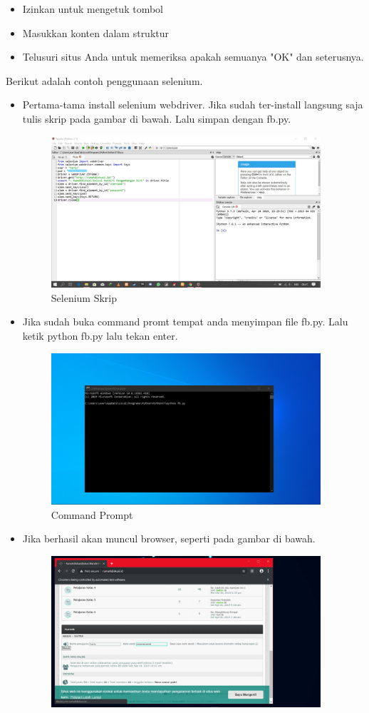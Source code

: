 \documentclass{article}
\begin{document}
\begin{itemize}
\item Izinkan untuk mengetuk tombol
\item Masukkan konten dalam struktur
\item Telusuri situs Anda untuk memeriksa apakah semuanya "OK" dan seterusnya.
\end{itemize}
Berikut adalah contoh penggunaan selenium.
\begin{itemize}
\item Pertama-tama install selenium webdriver. Jika sudah ter-install langsung saja tulis skrip pada gambar di bawah. Lalu simpan dengan fb.py.
\begin{figure}[!htbp]
	\centering
	\includegraphics[width=10cm]{figures/selenium10.jpg}
	\caption{Selenium Skrip}
\end{figure}
\item Jika sudah buka command promt tempat anda menyimpan file fb.py. Lalu ketik python fb.py lalu tekan enter.
\begin{figure}[!htbp]
	\centering
	\includegraphics[width=10cm]{figures/selenium11.png}
	\caption{Command Prompt}
\end{figure}
\item Jika berhasil akan muncul browser, seperti pada gambar di bawah.
\begin{figure}[!htbp]
	\centering
	\includegraphics[width=10cm]{figures/selenium7.png}

\end{figure}
\end{itemize}
\end{document}
